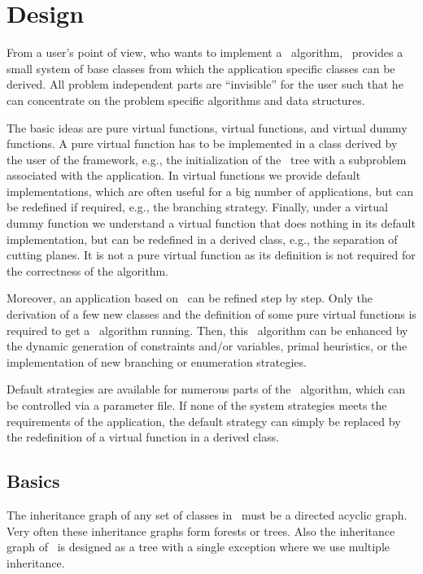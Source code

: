 
\chapter{Design}
\label{chapter:design}

From a user's point of view, who wants to implement
a \lpbab\ algorithm, \ABACUS\ provides a small system of base
classes from which the application specific classes can be derived.
All problem independent parts are ``invisible'' for the user
such that he can concentrate on the problem specific algorithms and
data structures.

The basic ideas are pure virtual functions, virtual functions, and virtual
dummy functions. A pure virtual function has to be implemented in
a class derived by the user of the framework, e.g., the initialization
of the \bab\ tree with a subproblem associated with the
application. In virtual functions
we provide default implementations, which are often useful for a big
number of applications, but can be redefined if required, e.g., the
branching strategy. Finally,
under a virtual dummy function
we understand a virtual function that
does nothing in its default implementation, but can be redefined in
a derived class, e.g., the separation of cutting planes. 
It is not a pure virtual function as its definition
is not required for the correctness of the algorithm.

Moreover, an application based on \ABACUS\ can be refined step by step.
Only the derivation of a few new classes and the definition of some pure
virtual functions is required to get a \bab\ algorithm running.
Then, this \bab\ algorithm can be enhanced by the dynamic generation of
constraints and/or variables, primal heuristics, 
or the implementation of new branching or enumeration strategies. 

Default strategies are available for numerous
parts of the \bab\ algorithm, which can be controlled via a parameter
file. If none of the system strategies meets the requirements of 
the application, the default strategy can simply be replaced by the
redefinition of a virtual function in a derived class.

\section{Basics}
\label{section:DesignBasics}

The inheritance graph of any set of 
classes in \CPLUSPLUS\ must be
a directed acyclic graph. Very often these inheritance graphs
form forests or trees. Also the inheritance graph of \ABACUS\ is designed as
a tree with a single exception where we use multiple inheritance. 

